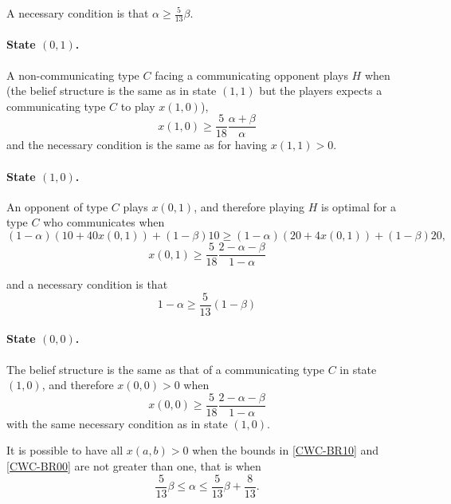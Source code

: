 \documentclass[12pt]{article}
\theoremstyle{break}
\begin{document}
A necessary condition is that $\alpha\geq \frac{5}{13}\beta$.

\paragraph{State $(0,1)$.} A non-communicating type $C$ facing a communicating opponent plays $H$ when (the belief structure is the same as in state $(1,1)$ but the players expects a communicating type $C$ to play $x(1,0)$),
\begin{equation}\label{CWC-BR01}
	x(1,0)\geq \frac{5}{18}\frac{\alpha+\beta}{\alpha}
\end{equation}
%
and the necessary condition is the same as for having $x(1,1)>0$.

\paragraph{State $(1,0)$.} An opponent of type $C$ plays $x(0,1)$, and therefore playing $H$ is optimal for a type $C$ who communicates when
\[
(1-\alpha)(10+40x(0,1))+(1-\beta) 10 \geq (1-\alpha)(20+4x(0,1))+(1-\beta) 20,
\]
\begin{equation}\label{CWC-BR10}
	x(0,1)\geq \frac{5}{18}\frac{2-\alpha-\beta}{1-\alpha}
\end{equation}

and a necessary condition is that 
\[
1-\alpha\geq \frac{5}{13}(1-\beta)
\]

%
\paragraph{State $(0,0)$.} The belief structure is the same as that of a communicating type $C$ in state $(1,0)$, and therefore $x(0,0)>0$ when
\begin{equation}\label{CWC-BR00}
	x(0,0)\geq \frac{5}{18}\frac{2-\alpha-\beta}{1-\alpha}
\end{equation}
with the same necessary condition as in state $(1,0)$.

It is possible to have all $x(a,b)>0$ when the bounds in \eqref{CWC-BR10} and \eqref{CWC-BR00} are not greater than one, that is when
\begin{equation}\label{xij>0-CWC}
	\frac{5}{13}\beta\leq \alpha \leq \frac{5}{13}\beta+\frac{8}{13}.
\end{equation}
%
\end{document}
